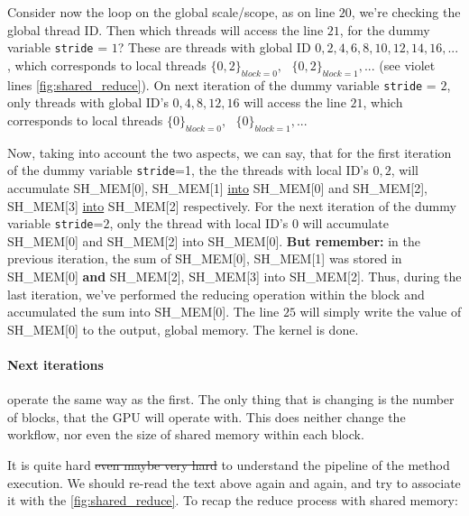 \documentclass[12pt]{article}
\begin{document}
Consider now the loop on the global scale/scope, as on line $20$, 
we're checking the global thread ID. Then which threads will access the line $21$, for the dummy variable \verb|stride| = $1$? 
These are threads with global ID $0,2,4,6,8,10,12,14,16, ... $, which corresponds to local threads
$\{0,2\}_{block=0},\text{ }\{0,2\}_{block=1}, ...$ (see violet lines \autoref{fig:shared_reduce}). 
On next iteration of the dummy variable \verb|stride| = $2$, only threads with global 
ID's $0,4,8,12,16$ will access the line $21$, which corresponds to local threads $\{0\}_{block=0},\text{ }\{0\}_{block=1}, ...$

Now, taking into account the two aspects, we can say, that for the first iteration of the dummy variable \verb|stride|=1, the 
the threads with local ID's $0,2$, will accumulate SH\_MEM[0], SH\_MEM[1] \underline{into} 
SH\_MEM[0] and SH\_MEM[2], SH\_MEM[3] \underline{into} SH\_MEM[2] respectively. 
For the next iteration of the dummy variable \verb|stride|=$2$, only the thread with local ID's $0$ 
will accumulate SH\_MEM[0] and SH\_MEM[2] into SH\_MEM[0]. \textbf{But remember: } in the previous iteration, 
the sum of SH\_MEM[0], SH\_MEM[1] was stored in SH\_MEM[0] \textbf{and} SH\_MEM[2], SH\_MEM[3] into SH\_MEM[2]. 
Thus, during the last iteration, we've performed the reducing operation within the block and accumulated the sum into SH\_MEM[0]. 
The line $25$ will simply write the value of SH\_MEM[0] to the output, global memory.  The kernel is done. 

\paragraph*{Next iterations} operate the same way as the first. The only thing that is changing is the number 
of blocks, that the GPU will operate with. This does neither change the workflow, nor even the size of 
shared memory within each block. 

It is quite hard \sout{even maybe very hard} to understand the pipeline of the method execution. 
We should re-read the text above again and again, and try to associate it with the \autoref{fig:shared_reduce}.
To recap the reduce process with shared memory:  
\end{document}
